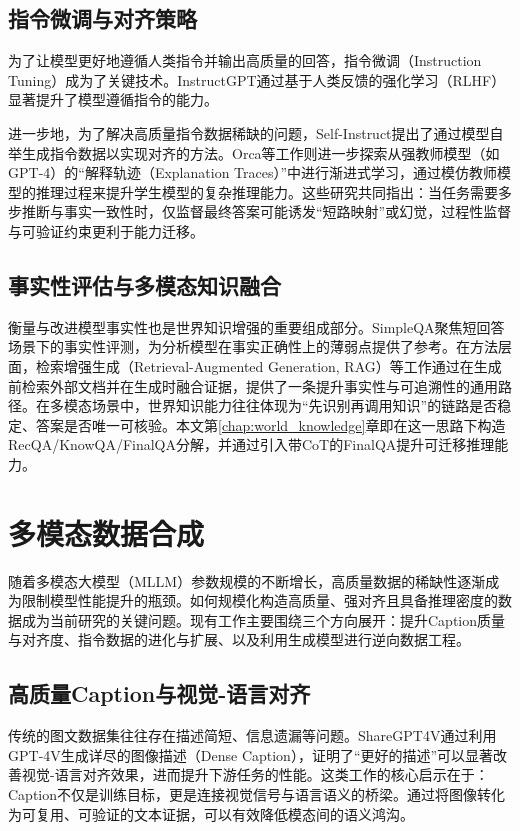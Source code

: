 \subsection{指令微调与对齐策略}
为了让模型更好地遵循人类指令并输出高质量的回答，指令微调（Instruction Tuning）成为了关键技术。InstructGPT通过基于人类反馈的强化学习（RLHF）显著提升了模型遵循指令的能力\citep{ouyang2022training}。

进一步地，为了解决高质量指令数据稀缺的问题，Self-Instruct提出了通过模型自举生成指令数据以实现对齐的方法\citep{wang2023selfinstruct}。Orca等工作则进一步探索从强教师模型（如GPT-4）的“解释轨迹（Explanation Traces）”中进行渐进式学习，通过模仿教师模型的推理过程来提升学生模型的复杂推理能力\citep{mukherjee2023orca}。这些研究共同指出：当任务需要多步推断与事实一致性时，仅监督最终答案可能诱发“短路映射”或幻觉，过程性监督与可验证约束更利于能力迁移。

\subsection{事实性评估与多模态知识融合}
衡量与改进模型事实性也是世界知识增强的重要组成部分。SimpleQA聚焦短回答场景下的事实性评测，为分析模型在事实正确性上的薄弱点提供了参考\citep{wei2024simpleqa}。在方法层面，检索增强生成（Retrieval-Augmented Generation, RAG）等工作通过在生成前检索外部文档并在生成时融合证据，提供了一条提升事实性与可追溯性的通用路径\citep{lewis2020rag}。在多模态场景中，世界知识能力往往体现为“先识别再调用知识”的链路是否稳定、答案是否唯一可核验。本文第\ref{chap:world_knowledge}章即在这一思路下构造RecQA/KnowQA/FinalQA分解，并通过引入带CoT的FinalQA提升可迁移推理能力。

\section{多模态数据合成}
随着多模态大模型（MLLM）参数规模的不断增长，高质量数据的稀缺性逐渐成为限制模型性能提升的瓶颈。如何规模化构造高质量、强对齐且具备推理密度的数据成为当前研究的关键问题。现有工作主要围绕三个方向展开：提升Caption质量与对齐度、指令数据的进化与扩展、以及利用生成模型进行逆向数据工程。

\subsection{高质量Caption与视觉-语言对齐}
传统的图文数据集往往存在描述简短、信息遗漏等问题。ShareGPT4V通过利用GPT-4V生成详尽的图像描述（Dense Caption），证明了“更好的描述”可以显著改善视觉-语言对齐效果，进而提升下游任务的性能\citep{chen2023sharegpt4v}。这类工作的核心启示在于：Caption不仅是训练目标，更是连接视觉信号与语言语义的桥梁。通过将图像转化为可复用、可验证的文本证据，可以有效降低模态间的语义鸿沟。


